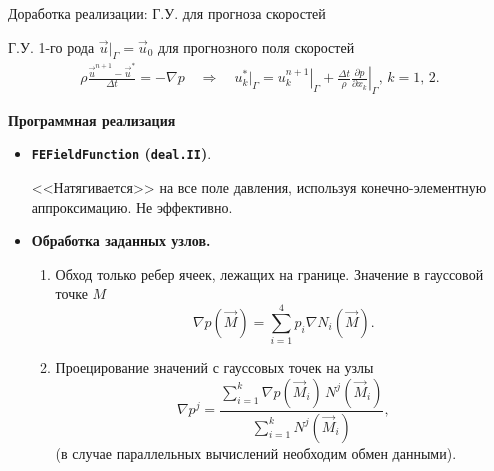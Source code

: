 \documentclass[9pt, ignoreonframetext,unicode]{beamer}
\begin{document}
\begin{frame}{Доработка реализации: Г.У. для прогноза скоростей}
		
 Г.У. 1-го рода $\vec{u}|_\Gamma = \vec{u}_0$ для прогнозного поля скоростей
				\begin{align*}
	\rho \frac{\vec{u}^{n+1} - \vec{u}^*}{\Delta t} = -\nabla p \quad \Rightarrow \quad 
	u^*_k|_\Gamma =\left.u^{n+1}_k\right|_\Gamma + \frac{\Delta t}{\rho}\left.\frac{\partial p}{\partial x_k}\right|_\Gamma,\,k=1,\,2.
\end{align*}


\begin{block}{\textbf{Программная реализация}}
	
	\begin{itemize}
		\item[\textcolor{red}{\textbullet}] \textbf{\texttt{FEFieldFunction} (\texttt{deal.II})}.
		
			<<Натягивается>> на все поле давления, используя конечно-элементную аппроксимацию. Не эффективно.
		
		
		\item[\textcolor{green}{\textbullet}] \textbf{Обработка заданных узлов.}
		\begin{enumerate}
		\item Обход только ребер ячеек, лежащих на границе. Значение в гауссовой точке $M$ 
		\begin{equation*}
			\nabla p(\vec{M}) = \sum_{i=1}^4 p_i \nabla N_i(\vec{M}).
		\end{equation*}
		\item Проецирование значений с гауссовых точек на узлы
		\begin{equation*}
			\label{projection}
			\nabla p^j=\frac{\sum_{i=1}^k \nabla p(\vec{M}_i)\,  N^j(\vec{M}_i)}{\sum_{i=1}^k N^j(\vec{M}_i)},
		\end{equation*}
		 (в случае параллельных вычислений необходим обмен данными).
		\end{enumerate}
	

\end{itemize}
\end{block}
\end{frame}
\end{document}
